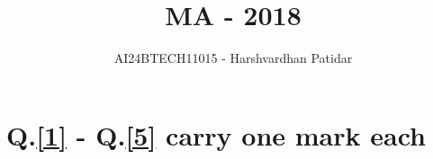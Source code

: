\documentclass[journal]{IEEEtran}
\begin{document}

\vspace{3cm}

\title{MA - 2018}
\author{AI24BTECH11015 - Harshvardhan Patidar}
 \maketitle
{\let\newpage\relax\maketitle}

\renewcommand{\thefigure}{\theenumi}
\renewcommand{\thetable}{\theenumi}
\setlength{\intextsep}{10pt} %


\renewcommand{\thetable}{\theenumi}

\section*{Q.\ref{1} - Q.\ref{5} carry one mark each}
\end{document}
